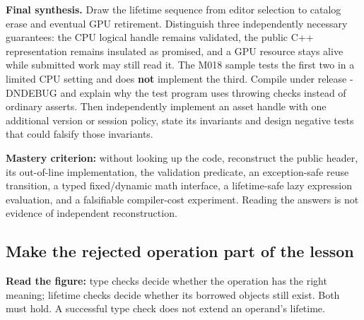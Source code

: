 \textbf{Final synthesis.} Draw the lifetime sequence from editor selection to catalog erase and eventual GPU retirement. Distinguish three independently necessary guarantees: the CPU logical handle remains validated, the public C++ representation remains insulated as promised, and a GPU resource stays alive while submitted work may still read it. The M018 sample tests the first two in a limited CPU setting and does \textbf{not} implement the third. Compile under release -DNDEBUG and explain why the test program uses throwing checks instead of ordinary asserts. Then independently implement an asset handle with one additional version or session policy, state its invariants and design negative tests that could falsify those invariants.

\textbf{Mastery criterion:} without looking up the code, reconstruct the public header, its out-of-line implementation, the validation predicate, an exception-safe reuse transition, a typed fixed/dynamic math interface, a lifetime-safe lazy expression evaluation, and a falsifiable compiler-cost experiment. Reading the answers is not evidence of independent reconstruction.

\subsection{Make the rejected operation part of the lesson}\label{appendix-960160274237-make-the-rejected-operation-part-of-the-lesson}

\hypertarget{appendix-960160274237-make-the-rejected-operation-part-of-the-lesson}{}


\textbf{Read the figure:} type checks decide whether the operation has the right meaning; lifetime checks decide whether its borrowed objects still exist. Both must hold. A successful type check does not extend an operand's lifetime.

